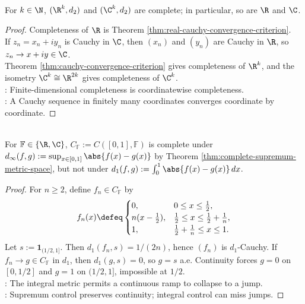 \begin{example} \label{ex:finite-dimensional-complete-metric-spaces} \\
For $k\in\N$, $(\R^k,d_2)$ and $(\C^k,d_2)$ are complete; in particular, so are $\R$ and $\C$.
\begin{proof}
Completeness of $\R$ is Theorem \ref{thm:real-cauchy-convergence-criterion}.\\
If $z_n=x_n+iy_n$ is Cauchy in $\C$, then $(x_n)$ and $(y_n)$ are Cauchy in $\R$, so $z_n\to x+iy\in\C$.\\
Theorem \ref{thm:cauchy-convergence-criterion} gives completeness of $\R^k$, and the isometry $\C^k\cong\R^{2k}$ gives completeness of $\C^k$.\\
: Finite-dimensional completeness is coordinatewise completeness.\\
: A Cauchy sequence in finitely many coordinates converges coordinate by coordinate.
\end{proof}
\end{example}

\begin{example} \label{ex:continuous-functions-sup-complete-integral-not-complete} \\
For $\mathbb{F}\in\{\R,\C\}$, $C_{\mathbb{F}}:=C([0,1],\mathbb{F})$ is complete under $d_\infty(f,g):=\sup_{x\in[0,1]}\abs{f(x)-g(x)}$ by Theorem \ref{thm:complete-supremum-metric-space}, but not under $d_1(f,g):=\int_0^1\abs{f(x)-g(x)}\,dx$.
\begin{proof}
For $n\ge2$, define $f_n\in C_{\mathbb{F}}$ by
\begin{equation*}
f_n(x)\defeq
\begin{cases}
0,&0\le x\le \frac12,\\
n(x-\frac12),&\frac12\le x\le \frac12+\frac1n,\\
1,&\frac12+\frac1n\le x\le1.
\end{cases}
\end{equation*}
Let $s:=\mathbf{1}_{(1/2,1]}$. Then $d_1(f_n,s)=1/(2n)$, hence $(f_n)$ is $d_1$-Cauchy. If $f_n\to g\in C_{\mathbb{F}}$ in $d_1$, then $d_1(g,s)=0$, so $g=s$ a.e. Continuity forces $g=0$ on $[0,1/2]$ and $g=1$ on $(1/2,1]$, impossible at $1/2$.\\
: The integral metric permits a continuous ramp to collapse to a jump.\\
: Supremum control preserves continuity; integral control can miss jumps.
\end{proof}
\end{example}

